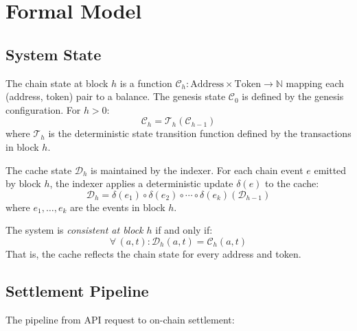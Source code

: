 \section{Formal Model}

\label{sec:model}

\subsection{System State}

\begin{definition}
The chain state at block $h$ is a function
$\mathcal{C}_h : \text{Address} \times \text{Token} \rightarrow
\mathbb{N}$ mapping each (address, token) pair to a balance.
The genesis state $\mathcal{C}_0$ is defined by the genesis
configuration.  For $h > 0$:
\[
  \mathcal{C}_h = \mathcal{T}_h(\mathcal{C}_{h-1})
\]
where $\mathcal{T}_h$ is the deterministic state transition function
defined by the transactions in block $h$.
\end{definition}

\begin{definition}
The cache state $\mathcal{D}_h$ is maintained by the indexer.  For
each chain event $e$ emitted by block $h$, the indexer applies a
deterministic update $\delta(e)$ to the cache:
\[
  \mathcal{D}_h = \delta(e_1) \circ \delta(e_2) \circ \cdots \circ
  \delta(e_k)(\mathcal{D}_{h-1})
\]
where $e_1, \ldots, e_k$ are the events in block $h$.
\end{definition}

\begin{definition}[Consistency]
The system is \emph{consistent at block $h$} if and only if:
\[
  \forall \, (a, t) : \mathcal{D}_h(a, t) = \mathcal{C}_h(a, t)
\]
That is, the cache reflects the chain state for every address and
token.
\end{definition}

\subsection{Settlement Pipeline}

The pipeline from API request to on-chain settlement:

